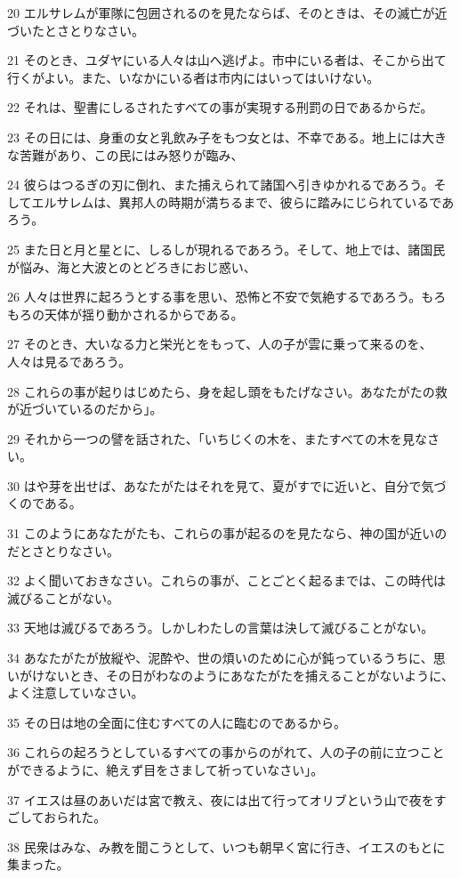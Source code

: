 \par 20 エルサレムが軍隊に包囲されるのを見たならば、そのときは、その滅亡が近づいたとさとりなさい。
\par 21 そのとき、ユダヤにいる人々は山へ逃げよ。市中にいる者は、そこから出て行くがよい。また、いなかにいる者は市内にはいってはいけない。
\par 22 それは、聖書にしるされたすべての事が実現する刑罰の日であるからだ。
\par 23 その日には、身重の女と乳飲み子をもつ女とは、不幸である。地上には大きな苦難があり、この民にはみ怒りが臨み、
\par 24 彼らはつるぎの刃に倒れ、また捕えられて諸国へ引きゆかれるであろう。そしてエルサレムは、異邦人の時期が満ちるまで、彼らに踏みにじられているであろう。
\par 25 また日と月と星とに、しるしが現れるであろう。そして、地上では、諸国民が悩み、海と大波とのとどろきにおじ惑い、
\par 26 人々は世界に起ろうとする事を思い、恐怖と不安で気絶するであろう。もろもろの天体が揺り動かされるからである。
\par 27 そのとき、大いなる力と栄光とをもって、人の子が雲に乗って来るのを、人々は見るであろう。
\par 28 これらの事が起りはじめたら、身を起し頭をもたげなさい。あなたがたの救が近づいているのだから」。
\par 29 それから一つの譬を話された、「いちじくの木を、またすべての木を見なさい。
\par 30 はや芽を出せば、あなたがたはそれを見て、夏がすでに近いと、自分で気づくのである。
\par 31 このようにあなたがたも、これらの事が起るのを見たなら、神の国が近いのだとさとりなさい。
\par 32 よく聞いておきなさい。これらの事が、ことごとく起るまでは、この時代は滅びることがない。
\par 33 天地は滅びるであろう。しかしわたしの言葉は決して滅びることがない。
\par 34 あなたがたが放縦や、泥酔や、世の煩いのために心が鈍っているうちに、思いがけないとき、その日がわなのようにあなたがたを捕えることがないように、よく注意していなさい。
\par 35 その日は地の全面に住むすべての人に臨むのであるから。
\par 36 これらの起ろうとしているすべての事からのがれて、人の子の前に立つことができるように、絶えず目をさまして祈っていなさい」。
\par 37 イエスは昼のあいだは宮で教え、夜には出て行ってオリブという山で夜をすごしておられた。
\par 38 民衆はみな、み教を聞こうとして、いつも朝早く宮に行き、イエスのもとに集まった。

